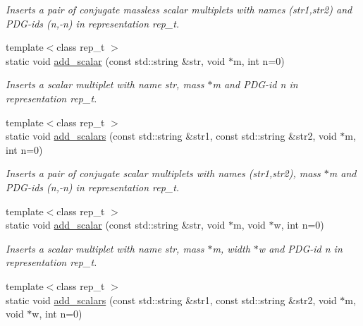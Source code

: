 \begin{DoxyCompactItemize}
\begin{DoxyCompactList}\small\item\em Inserts a pair of conjugate massless scalar multiplets with names (str1,str2) and P\+D\+G-\/ids (n,-\/n) in representation rep\+\_\+t. \end{DoxyCompactList}\item 
\hypertarget{a00372_a629a83856e1021fec02e12b01d6a7342}{}{\footnotesize template$<$class rep\+\_\+t $>$ }\\static void \hyperlink{a00372_a629a83856e1021fec02e12b01d6a7342}{add\+\_\+scalar} (const std\+::string \&str, void $\ast$m, int n=0)\label{a00372_a629a83856e1021fec02e12b01d6a7342}

\begin{DoxyCompactList}\small\item\em Inserts a scalar multiplet with name str, mass $\ast$m and P\+D\+G-\/id n in representation rep\+\_\+t. \end{DoxyCompactList}\item 
\hypertarget{a00372_a7e6c0da84c3155c80e37199817fd4a8d}{}{\footnotesize template$<$class rep\+\_\+t $>$ }\\static void \hyperlink{a00372_a7e6c0da84c3155c80e37199817fd4a8d}{add\+\_\+scalars} (const std\+::string \&str1, const std\+::string \&str2, void $\ast$m, int n=0)\label{a00372_a7e6c0da84c3155c80e37199817fd4a8d}

\begin{DoxyCompactList}\small\item\em Inserts a pair of conjugate scalar multiplets with names (str1,str2), mass $\ast$m and P\+D\+G-\/ids (n,-\/n) in representation rep\+\_\+t. \end{DoxyCompactList}\item 
\hypertarget{a00372_a97c2aafa864d22447b142020a05ad9ff}{}{\footnotesize template$<$class rep\+\_\+t $>$ }\\static void \hyperlink{a00372_a97c2aafa864d22447b142020a05ad9ff}{add\+\_\+scalar} (const std\+::string \&str, void $\ast$m, void $\ast$w, int n=0)\label{a00372_a97c2aafa864d22447b142020a05ad9ff}

\begin{DoxyCompactList}\small\item\em Inserts a scalar multiplet with name str, mass $\ast$m, width $\ast$w and P\+D\+G-\/id n in representation rep\+\_\+t. \end{DoxyCompactList}\item 
\hypertarget{a00372_af96849646b9097e3677961af7787811e}{}{\footnotesize template$<$class rep\+\_\+t $>$ }\\static void \hyperlink{a00372_af96849646b9097e3677961af7787811e}{add\+\_\+scalars} (const std\+::string \&str1, const std\+::string \&str2, void $\ast$m, void $\ast$w, int n=0)\label{a00372_af96849646b9097e3677961af7787811e}


\end{DoxyCompactItemize}
